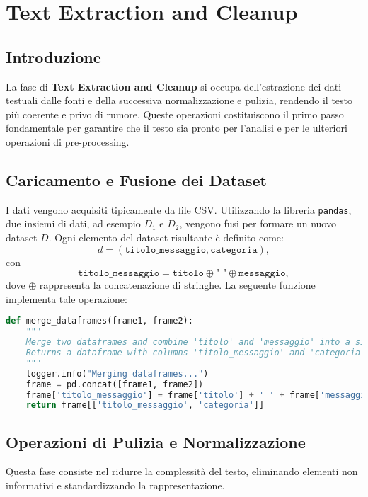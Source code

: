 \chapter{Text Extraction and Cleanup}

\section{Introduzione}
La fase di \textbf{Text Extraction and Cleanup} si occupa dell'estrazione dei dati testuali dalle fonti e della successiva normalizzazione e pulizia, rendendo il testo più coerente e privo di rumore. Queste operazioni costituiscono il primo passo fondamentale per garantire che il testo sia pronto per l'analisi e per le ulteriori operazioni di pre-processing.

\section{Caricamento e Fusione dei Dataset}
I dati vengono acquisiti tipicamente da file CSV. Utilizzando la libreria \texttt{pandas}, due insiemi di dati, ad esempio $D_1$ e $D_2$, vengono fusi per formare un nuovo dataset $D$. Ogni elemento del dataset risultante è definito come:
\[
d = (\texttt{titolo\_messaggio}, \texttt{categoria}),
\]
con
\[
\texttt{titolo\_messaggio} = \texttt{titolo} \oplus \texttt{" "} \oplus \texttt{messaggio},
\]
dove $\oplus$ rappresenta la concatenazione di stringhe. La seguente funzione implementa tale operazione:

\begin{lstlisting}[language=Python,caption={Funzione per la fusione dei DataFrame}]
def merge_dataframes(frame1, frame2):
    """
    Merge two dataframes and combine 'titolo' and 'messaggio' into a single column.
    Returns a dataframe with columns 'titolo_messaggio' and 'categoria'.
    """
    logger.info("Merging dataframes...")
    frame = pd.concat([frame1, frame2])
    frame['titolo_messaggio'] = frame['titolo'] + ' ' + frame['messaggio']
    return frame[['titolo_messaggio', 'categoria']]
\end{lstlisting}

\section{Operazioni di Pulizia e Normalizzazione}
Questa fase consiste nel ridurre la complessità del testo, eliminando elementi non informativi e standardizzando la rappresentazione.

